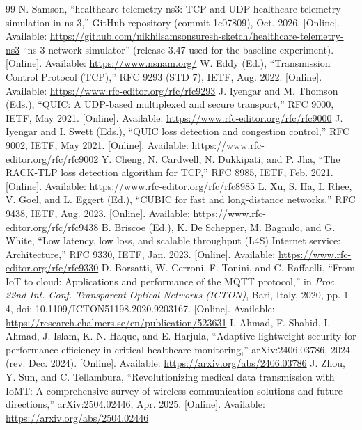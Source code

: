 \begin{thebibliography}{99}
\small
{} N. Samson, ``healthcare-telemetry-ns3: TCP and UDP healthcare telemetry simulation in ns-3,'' GitHub repository (commit 1c07809), Oct. 2026. [Online]. Available: \url{https://github.com/nikhilsamsonsuresh-sketch/healthcare-telemetry-ns3}
 ``ns-3 network simulator'' (release 3.47 used for the baseline experiment). [Online]. Available: \url{https://www.nsnam.org/}
 W. Eddy (Ed.), ``Transmission Control Protocol (TCP),'' RFC 9293 (STD 7), IETF, Aug. 2022. [Online]. Available: \url{https://www.rfc-editor.org/rfc/rfc9293}
 J. Iyengar and M. Thomson (Eds.), ``QUIC: A UDP-based multiplexed and secure transport,'' RFC 9000, IETF, May 2021. [Online]. Available: \url{https://www.rfc-editor.org/rfc/rfc9000}
 J. Iyengar and I. Swett (Eds.), ``QUIC loss detection and congestion control,'' RFC 9002, IETF, May 2021. [Online]. Available: \url{https://www.rfc-editor.org/rfc/rfc9002}
 Y. Cheng, N. Cardwell, N. Dukkipati, and P. Jha, ``The RACK-TLP loss detection algorithm for TCP,'' RFC 8985, IETF, Feb. 2021. [Online]. Available: \url{https://www.rfc-editor.org/rfc/rfc8985}
 L. Xu, S. Ha, I. Rhee, V. Goel, and L. Eggert (Ed.), ``CUBIC for fast and long-distance networks,'' RFC 9438, IETF, Aug. 2023. [Online]. Available: \url{https://www.rfc-editor.org/rfc/rfc9438}
 B. Briscoe (Ed.), K. De Schepper, M. Bagnulo, and G. White, ``Low latency, low loss, and scalable throughput (L4S) Internet service: Architecture,'' RFC 9330, IETF, Jan. 2023. [Online]. Available: \url{https://www.rfc-editor.org/rfc/rfc9330}
 D. Borsatti, W. Cerroni, F. Tonini, and C. Raffaelli, ``From IoT to cloud: Applications and performance of the MQTT protocol,'' in \emph{Proc. 22nd Int. Conf. Transparent Optical Networks (ICTON)}, Bari, Italy, 2020, pp. 1--4, doi: 10.1109/ICTON51198.2020.9203167. [Online]. Available: \url{https://research.chalmers.se/en/publication/523631}
 I. Ahmad, F. Shahid, I. Ahmad, J. Islam, K. N. Haque, and E. Harjula, ``Adaptive lightweight security for performance efficiency in critical healthcare monitoring,'' arXiv:2406.03786, 2024 (rev. Dec. 2024). [Online]. Available: \url{https://arxiv.org/abs/2406.03786}
 J. Zhou, Y. Sun, and C. Tellambura, ``Revolutionizing medical data transmission with IoMT: A comprehensive survey of wireless communication solutions and future directions,'' arXiv:2504.02446, Apr. 2025. [Online]. Available: \url{https://arxiv.org/abs/2504.02446}

\end{thebibliography}
